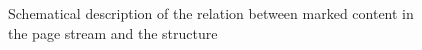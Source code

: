 \documentclass{article}
\begin{document}
\begin{figure}
\caption{Schematical description of the relation between marked content in the page stream and the structure}
\tagmcend\tagstructend
\end{figure}
\tagstructend
\end{document}
